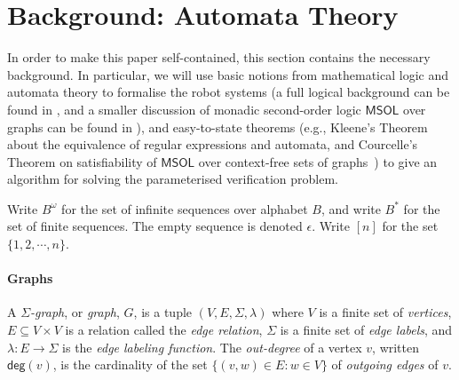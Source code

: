 \documentclass{aamas2015}
\def\deg{\textsf{deg}}
\def\fol{\mathsf{FOL}}
\def\msol{\mathsf{MSOL}}
\def\fotc{\mathsf{FOL+TC}}
\begin{document}

\section{Background: Automata Theory}  \label{sec:prelim}

In order to make this paper self-contained, this section contains the necessary background. In particular, we will use basic notions from mathematical logic and automata theory to formalise the robot systems (a full logical background can be found in \cite{EbFl95}, and a smaller discussion of monadic second-order logic $\msol$ over graphs can be found in \cite[Section $1.3.1$]{CE12}), and easy-to-state theorems (e.g., Kleene's Theorem about the equivalence of regular expressions and automata, and Courcelle's Theorem on satisfiability of $\msol$ over context-free sets of graphs~\cite{CE12}) to give an algorithm for solving the parameterised verification problem.

 


Write $B^\omega$ for the set of infinite sequences over alphabet $B$, and write $B^*$ for the set of finite sequences. The empty sequence is denoted $\epsilon$. Write $[n]$ for the set $\{1,2,\cdots,n\}$.



\paragraph{Graphs}
A {\em $\Sigma$-graph}, or {\em graph}, $G$, is a tuple $(V,E,\Sigma,\lambda)$ where $V$ is a finite set of {\em vertices}, $E \subseteq V \times V$ is a  relation called the {\em edge relation}, $\Sigma$ is a finite set of {\em edge labels}, and $\lambda:E \to \Sigma$ is the {\em edge labeling function}. 
The {\em out-degree} of a vertex $v$, written $\deg(v)$, is the cardinality of the set $\{(v,w) \in E : w \in V\}$ of {\em outgoing edges} of $v$.
\end{document}
